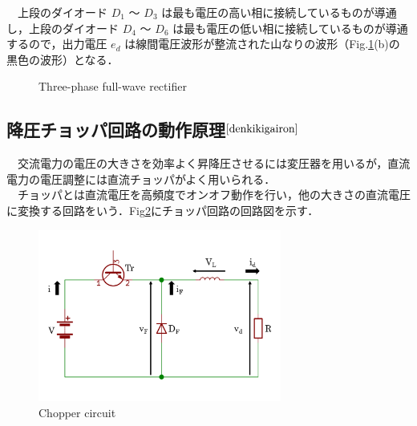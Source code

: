 　上段のダイオード $D_1$ 〜 $D_3$ は最も電圧の高い相に接続しているものが導通し，上段のダイオード $D_4$ 〜 $D_6$ は最も電圧の低い相に接続しているものが導通するので，出力電圧 $e_d$ は線間電圧波形が整流された山なりの波形（Fig.\ref{fig:three_phase_full_wave_rectifier}(b)の黒色の波形）となる．
\begin{figure}[H]
    \begin{center}
    \end{center}
    \caption{Three-phase full-wave rectifier}
    \label{fig:three_phase_full_wave_rectifier}
\end{figure}

\subsection{降圧チョッパ回路の動作原理$^{\cite{denkikigairon}}$}
　交流電力の電圧の大きさを効率よく昇降圧させるには変圧器を用いるが，直流電力の電圧調整には直流チョッパがよく用いられる．\\
　チョッパとは直流電圧を高頻度でオンオフ動作を行い，他の大きさの直流電圧に変換する回路をいう．Fig\ref{fig:chopper_circuit}にチョッパ回路の回路図を示す．

\begin{figure}[H]
    \centering
    \includegraphics[width=8cm]{./fig/chopper_circuit.pdf}
    \caption{Chopper circuit}
    \label{fig:chopper_circuit}
\end{figure}

